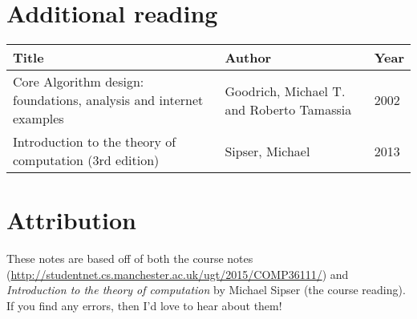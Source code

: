 \section*{Additional reading}

\begin{tabularx}{\textwidth} {|X|X|l|}
  \hline
  
  Title & Author & Year\\ \hline
    Core Algorithm design: foundations, analysis and internet examples &
    Goodrich, Michael T. and Roberto Tamassia &
    2002 \\ \hline
    Introduction to the theory of computation (3rd edition) &
    Sipser, Michael&
    2013\\ \hline
\end{tabularx}

\section*{Attribution}

These notes are based off of both the course notes
(\url{http://studentnet.cs.manchester.ac.uk/ugt/2015/COMP36111/}) and
\textit{Introduction to the theory of computation} by Michael Sipser (the course
reading). If you find any errors, then I'd love to hear about them!
